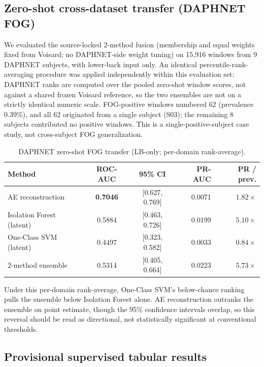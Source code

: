 \subsection{Zero-shot cross-dataset transfer (DAPHNET FOG)}

We evaluated the source-locked 2-method fusion (membership and equal weights fixed from Voisard; no DAPHNET-side weight tuning) on 15{,}916 windows from 9 DAPHNET subjects, with lower-back input only. An identical percentile-rank-averaging procedure was applied independently within this evaluation set: DAPHNET ranks are computed over the pooled zero-shot window scores, not against a shared frozen Voisard reference, so the two ensembles are not on a strictly identical numeric scale. FOG-positive windows numbered 62 (prevalence 0.39\%), and all 62 originated from a single subject (S03); the remaining 8 subjects contributed no positive windows. This is a single-positive-subject case study, not cross-subject FOG generalization.

\begin{table}[ht]
\centering
\caption{DAPHNET zero-shot FOG transfer (LB-only; per-domain rank-average).}
\label{tab:daphnet}
\begin{tabular}{lccrr}
\toprule
Method & ROC-AUC & 95\% CI & PR-AUC & PR / prev. \\
\midrule
AE reconstruction & \textbf{0.7046} & [0.627, 0.769] & 0.0071 & $1.82\times$ \\
Isolation Forest (latent) & 0.5884 & [0.463, 0.726] & 0.0199 & $5.10\times$ \\
One-Class SVM (latent) & 0.4497 & [0.323, 0.582] & 0.0033 & $0.84\times$ \\
2-method ensemble & 0.5314 & [0.405, 0.664] & 0.0223 & $5.73\times$ \\
\bottomrule
\end{tabular}
\end{table}

Under this per-domain rank-average, One-Class SVM's below-chance ranking pulls the ensemble below Isolation Forest alone. AE reconstruction outranks the ensemble on point estimate, though the 95\% confidence intervals overlap, so this reversal should be read as directional, not statistically significant at conventional thresholds.

\subsection{Provisional supervised tabular results}
\label{sec:res-tabular}

